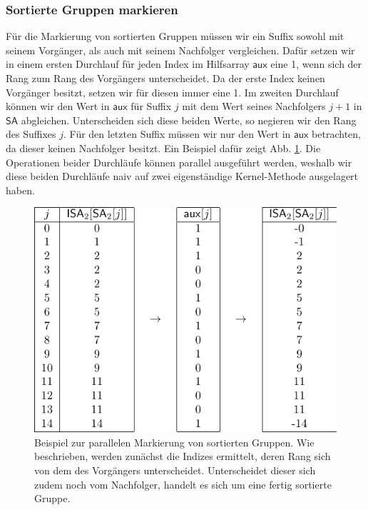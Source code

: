\subsubsection{Sortierte Gruppen markieren}
Für die Markierung von sortierten Gruppen müssen wir ein Suffix sowohl mit seinem Vorgänger, als auch mit seinem Nachfolger vergleichen. Dafür setzen wir in einem ersten Durchlauf für jeden Index im Hilfsarray $\mathsf{aux}$ eine 1, wenn sich der Rang zum Rang des Vorgängers unterscheidet. Da der erste Index keinen Vorgänger besitzt, setzen wir für diesen immer eine 1. Im zweiten Durchlauf können wir den Wert in $\mathsf{aux}$ für Suffix $j$ mit dem Wert seines Nachfolgers $j+1$ in $\mathsf{SA}$ abgleichen. Unterscheiden sich diese beiden Werte, so negieren wir den Rang des Suffixes $j$. Für den letzten Suffix müssen wir nur den Wert in $\mathsf{aux}$ betrachten, da dieser keinen Nachfolger besitzt. Ein Beispiel dafür zeigt Abb. \ref{osipov:mark}.
Die Operationen beider Durchläufe können parallel ausgeführt werden, weshalb wir diese beiden Durchläufe naiv auf zwei eigenständige Kernel-Methode ausgelagert haben.
\begin{center}
\begin{figure}
\includegraphics[scale=1]{kapitel/saca_algorithmen/osipov/mark_singletons_example.pdf}
\caption{Beispiel zur parallelen Markierung von sortierten Gruppen. Wie beschrieben, werden zunächst die Indizes ermittelt, deren Rang sich von dem des Vorgängers unterscheidet. Unterscheidet dieser sich zudem noch vom Nachfolger, handelt es sich um eine fertig sortierte Gruppe.}
\label{osipov:mark}
\end{figure}

\end{center}
